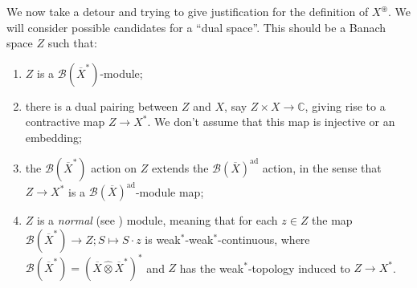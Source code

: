 \documentclass[a4paper,11pt]{article}
\theoremstyle{plain}
\theoremstyle{remark}
\newcommand{\mc}[1]{\mathcal{#1}}
\newcommand{\proten}{\widehat\otimes}
\newcommand{\intdual}{\circledast}
\newcommand{\ad}{{\operatorname{ad}}}
\begin{document}
We now take a detour and trying to give justification for the definition of $X^\intdual$.  We will consider possible candidates for a ``dual space''.  This should be a Banach space $Z$ such that:
\begin{enumerate}
  \item $Z$ is a $\mc B(\overline X^*)$-module;
  \item there is a dual pairing between $Z$ and $X$, say $Z\times X\to\mathbb C$, giving rise to a contractive map $Z\to X^*$.  We don't assume that this map is injective or an embedding;
  \item the $\mc B(\overline X^*)$ action on $Z$ extends the $\mc B(\overline X)^\ad$ action, in the sense that $Z\to X^*$ is a $\mc B(\overline X)^\ad$-module map;
  \item $Z$ is a \emph{normal} (see \cite{Runde_ConnesAmen_1}) module, meaning that for each $z\in Z$ the map $\mc B(\overline X^*) \to Z; S\mapsto S\cdot z$ is weak$^*$-weak$^*$-continuous, where $\mc B(\overline X^*) = (\overline X \proten \overline X^*)^*$ and $Z$ has the weak$^*$-topology induced to $Z\to X^*$.
\end{enumerate}
\end{document}
